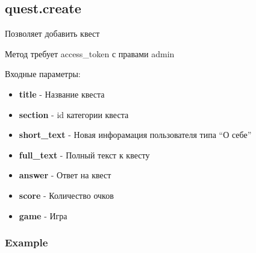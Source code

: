 \subsection{quest.create}
Позволяет добавить квест

Метод требует access\_token с правами admin

Входные параметры:
\begin{itemize}
  \item \textbf{title} - Название квеста
  \item \textbf{section} - id категории квеста
  \item \textbf{short\_text} - Новая инфорамация пользователя типа “О себе”
  \item \textbf{full\_text} - Полный текст к квесту
  \item \textbf{answer} - Ответ на квест
  \item \textbf{score} - Количество очков
  \item \textbf{game} - Игра
\end{itemize}

\subsubsection{Example}
\begin{Verbatim}[frame=single]

\end{Verbatim}